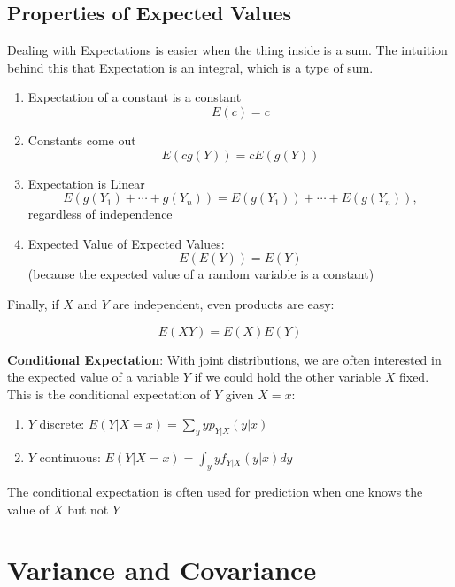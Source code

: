 \documentclass[
]{book}
\begin{document}
\hypertarget{properties-of-expected-values}{%
\subsection*{Properties of Expected Values}\label{properties-of-expected-values}}

Dealing with Expectations is easier when the thing inside is a sum. The intuition behind this that Expectation is an integral, which is a type of sum.

\begin{enumerate}
\def\labelenumi{\arabic{enumi}.}
\tightlist
\item
  Expectation of a constant is a constant \[E(c)=c\]
\item
  Constants come out \[E(c g(Y))= c E(g(Y))\]
\item
  Expectation is Linear \[E(g(Y_1) + \cdots + g(Y_n))=E(g(Y_1)) +\cdots+E(g(Y_n)),\] regardless of independence
\item
  Expected Value of Expected Values: \[E(E(Y)) = E(Y)\] (because the expected value of a random variable is a constant)
\end{enumerate}

Finally, if \(X\) and \(Y\) are independent, even products are easy:

\[E(XY) = E(X)E(Y)\]

\textbf{Conditional Expectation}: With joint distributions, we are often interested in the expected value of a variable \(Y\) if we could hold the other variable \(X\) fixed. This is the conditional expectation of \(Y\) given \(X = x\):

\begin{enumerate}
\def\labelenumi{\arabic{enumi}.}
\tightlist
\item
  \(Y\) discrete: \(E(Y|X = x) = \sum_y yp_{Y|X}(y|x)\)
\item
  \(Y\) continuous: \(E(Y|X = x) = \int_y yf_{Y|X}(y|x)dy\)
\end{enumerate}

The conditional expectation is often used for prediction when one knows the value of \(X\) but not \(Y\)

\hypertarget{variance-and-covariance}{%
\section{Variance and Covariance}\label{variance-and-covariance}}
\end{document}
